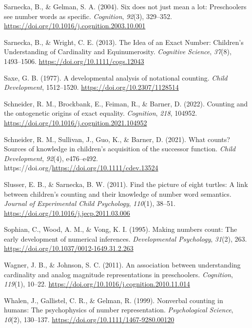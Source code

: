 \documentclass[
  man,floatsintext]{apa7}
\newlength{\cslhangindent}
\newenvironment{CSLReferences}[2] %
 {\begin{list}{}{%
  \setlength{\itemindent}{0pt}
  \setlength{\leftmargin}{0pt}
  \setlength{\parsep}{0pt}
  \ifodd #1
   \setlength{\leftmargin}{\cslhangindent}
   \setlength{\itemindent}{-1\cslhangindent}
  \fi
  \setlength{\itemsep}{#2\baselineskip}}}
 {\end{list}}
\begin{document}
\begin{CSLReferences}{1}{0}
Sarnecka, B., \& Gelman, S. A. (2004). Six does not just mean a lot: Preschoolers see number words as specific. \emph{Cognition}, \emph{92}(3), 329--352. \url{https://doi.org/10.1016/j.cognition.2003.10.001}

Sarnecka, B., \& Wright, C. E. (2013). The {Idea} of an {Exact} {Number}: {Children}'s {Understanding} of {Cardinality} and {Equinumerosity}. \emph{Cognitive Science}, \emph{37}(8), 1493--1506. \url{https://doi.org/10.1111/cogs.12043}

Saxe, G. B. (1977). A developmental analysis of notational counting. \emph{Child Development}, 1512--1520. \url{https://doi.org/10.2307/1128514}

Schneider, R. M., Brockbank, E., Feiman, R., \& Barner, D. (2022). Counting and the ontogenetic origins of exact equality. \emph{Cognition}, \emph{218}, 104952. \url{https://doi.org/10.1016/j.cognition.2021.104952}

Schneider, R. M., Sullivan, J., Guo, K., \& Barner, D. (2021). What counts? Sources of knowledge in children's acquisition of the successor function. \emph{Child Development}, \emph{92}(4), e476--e492. https://doi.org/\url{https://doi.org/10.1111/cdev.13524}

Slusser, E. B., \& Sarnecka, B. W. (2011). Find the picture of eight turtles: A link between children's counting and their knowledge of number word semantics. \emph{Journal of Experimental Child Psychology}, \emph{110}(1), 38--51. \url{https://doi.org/10.1016/j.jecp.2011.03.006}

Sophian, C., Wood, A. M., \& Vong, K. I. (1995). Making numbers count: The early development of numerical inferences. \emph{Developmental Psychology}, \emph{31}(2), 263. \url{https://doi.org/10.1037/0012-1649.31.2.263}

Wagner, J. B., \& Johnson, S. C. (2011). An association between understanding cardinality and analog magnitude representations in preschoolers. \emph{Cognition}, \emph{119}(1), 10--22. \url{https://doi.org/10.1016/j.cognition.2010.11.014}

Whalen, J., Gallistel, C. R., \& Gelman, R. (1999). Nonverbal counting in humans: The psychophysics of number representation. \emph{Psychological Science}, \emph{10}(2), 130--137. \url{https://doi.org/10.1111/1467-9280.00120}


\end{CSLReferences}
\end{document}
